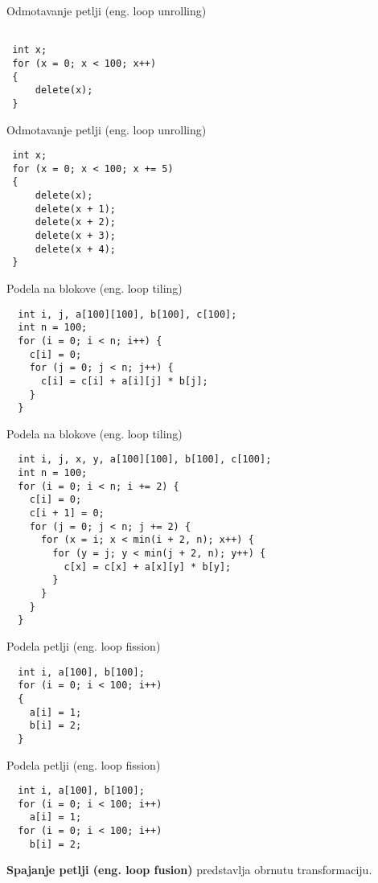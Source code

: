 \documentclass[10pt]{beamer}
\begin{document}
\begin{frame}[fragile]{Odmotavanje petlji (eng. loop unrolling)}
\begin{lstlisting}

 int x;
 for (x = 0; x < 100; x++)
 {
     delete(x);
 }
\end{lstlisting}
\end{frame}

\begin{frame}[fragile]{Odmotavanje petlji (eng. loop unrolling)}
\begin{lstlisting}
 int x; 
 for (x = 0; x < 100; x += 5)
 {
     delete(x);
     delete(x + 1);
     delete(x + 2);
     delete(x + 3);
     delete(x + 4);
 }
\end{lstlisting}
\end{frame}

\begin{frame}[fragile]{Podela na blokove (eng. loop tiling)}
\begin{lstlisting}
  int i, j, a[100][100], b[100], c[100];
  int n = 100;
  for (i = 0; i < n; i++) {
    c[i] = 0;
    for (j = 0; j < n; j++) {
      c[i] = c[i] + a[i][j] * b[j];
    }
  }
\end{lstlisting}
\end{frame}

\begin{frame}[fragile]{Podela na blokove (eng. loop tiling)}
\begin{lstlisting}
  int i, j, x, y, a[100][100], b[100], c[100];
  int n = 100;
  for (i = 0; i < n; i += 2) {
    c[i] = 0;
    c[i + 1] = 0;
    for (j = 0; j < n; j += 2) {
      for (x = i; x < min(i + 2, n); x++) {
        for (y = j; y < min(j + 2, n); y++) {
          c[x] = c[x] + a[x][y] * b[y];
        }
      }
    }
  }
\end{lstlisting}
\end{frame}

\begin{frame}[fragile]{Podela petlji (eng. loop fission)}
\begin{lstlisting}
  int i, a[100], b[100];
  for (i = 0; i < 100; i++)
  {
    a[i] = 1; 
    b[i] = 2;
  }
\end{lstlisting}
\end{frame}

\begin{frame}[fragile]{Podela petlji (eng. loop fission)}
\begin{lstlisting}
  int i, a[100], b[100];
  for (i = 0; i < 100; i++)
    a[i] = 1;                     
  for (i = 0; i < 100; i++)
    b[i] = 2;
\end{lstlisting}
\textbf{Spajanje petlji (eng. loop fusion)} predstavlja obrnutu transformaciju.
\end{frame}
\end{document}

